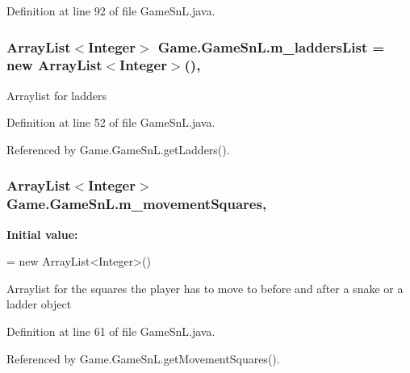 Definition at line 92 of file Game\+Sn\+L.\+java.

\hypertarget{class_game_1_1_game_sn_l_a0b47e32e0960ed988d341b31b5f3bd3b}{}
\subsubsection[{m\+\_\+ladders\+List}]{\setlength{\rightskip}{0pt plus 5cm}Array\+List$<$Integer$>$ Game.\+Game\+Sn\+L.\+m\+\_\+ladders\+List = new Array\+List$<$Integer$>$()\hspace{0.3cm}{\ttfamily [static]}, {\ttfamily [private]}}\label{class_game_1_1_game_sn_l_a0b47e32e0960ed988d341b31b5f3bd3b}
Arraylist for ladders 

Definition at line 52 of file Game\+Sn\+L.\+java.



Referenced by Game.\+Game\+Sn\+L.\+get\+Ladders().

\hypertarget{class_game_1_1_game_sn_l_af8c7ff07d44c8713db098772d7888478}{}
\subsubsection[{m\+\_\+movement\+Squares}]{\setlength{\rightskip}{0pt plus 5cm}Array\+List$<$Integer$>$ Game.\+Game\+Sn\+L.\+m\+\_\+movement\+Squares\hspace{0.3cm}{\ttfamily [static]}, {\ttfamily [private]}}\label{class_game_1_1_game_sn_l_af8c7ff07d44c8713db098772d7888478}
{\bfseries Initial value\+:}
\begin{DoxyCode}
= 
            \textcolor{keyword}{new} ArrayList<Integer>()
\end{DoxyCode}
Arraylist for the squares the player has to move to before and after a snake or a ladder object 

Definition at line 61 of file Game\+Sn\+L.\+java.



Referenced by Game.\+Game\+Sn\+L.\+get\+Movement\+Squares().

\hypertarget{class_game_1_1_game_sn_l_af12170048b789d0c3303ab35c9b58413}{}
